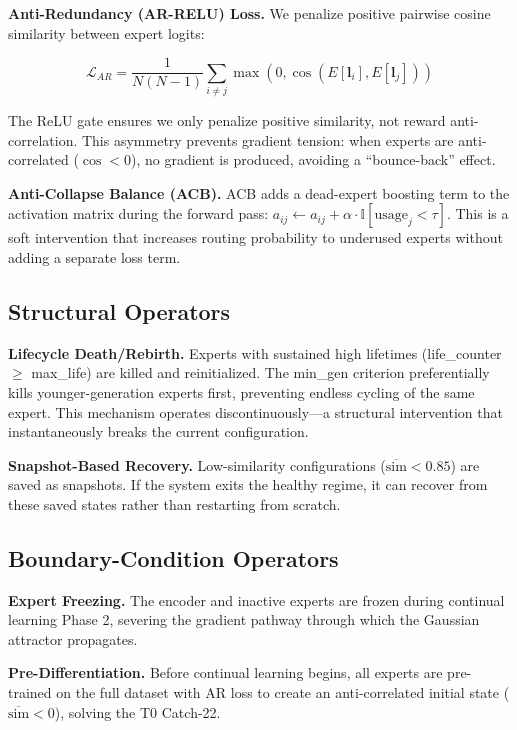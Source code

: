 \documentclass[twoside]{article}
\theoremstyle{definition}
\begin{document}
\textbf{Anti-Redundancy (AR-RELU) Loss.} We penalize positive pairwise cosine similarity between expert logits:

$$\mathcal{L}_{AR} = \frac{1}{N(N-1)} \sum_{i \neq j} \max(0, \cos(E[\mathbf{l}_i], E[\mathbf{l}_j]))$$

The ReLU gate ensures we only penalize positive similarity, not reward anti-correlation. This asymmetry prevents gradient tension: when experts are anti-correlated ($\cos < 0$), no gradient is produced, avoiding a ``bounce-back'' effect.

\textbf{Anti-Collapse Balance (ACB).} ACB adds a dead-expert boosting term to the activation matrix during the forward pass: $a_{ij} \leftarrow a_{ij} + \alpha \cdot \mathbb{I}[\text{usage}_j < \tau]$. This is a soft intervention that increases routing probability to underused experts without adding a separate loss term.

\subsection{Structural Operators}

\textbf{Lifecycle Death/Rebirth.} Experts with sustained high lifetimes (life\_counter $\geq$ max\_life) are killed and reinitialized. The min\_gen criterion preferentially kills younger-generation experts first, preventing endless cycling of the same expert. This mechanism operates discontinuously---a structural intervention that instantaneously breaks the current configuration.

\textbf{Snapshot-Based Recovery.} Low-similarity configurations ($\overline{\text{sim}} < 0.85$) are saved as snapshots. If the system exits the healthy regime, it can recover from these saved states rather than restarting from scratch.

\subsection{Boundary-Condition Operators}

\textbf{Expert Freezing.} The encoder and inactive experts are frozen during continual learning Phase 2, severing the gradient pathway through which the Gaussian attractor propagates.

\textbf{Pre-Differentiation.} Before continual learning begins, all experts are pre-trained on the full dataset with AR loss to create an anti-correlated initial state ($\overline{\text{sim}} < 0$), solving the T0 Catch-22.
\end{document}
